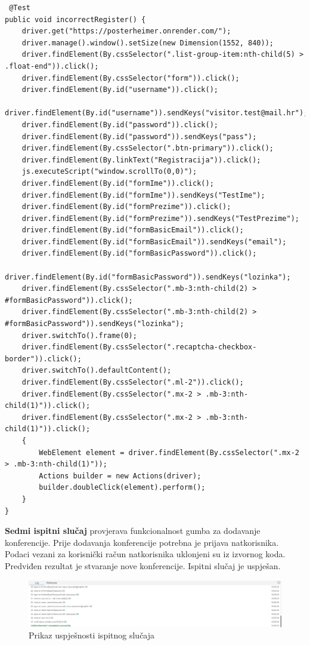 			\begin{lstlisting}
 @Test
public void incorrectRegister() {
	driver.get("https://posterheimer.onrender.com/");
	driver.manage().window().setSize(new Dimension(1552, 840));
	driver.findElement(By.cssSelector(".list-group-item:nth-child(5) > .float-end")).click();
	driver.findElement(By.cssSelector("form")).click();
	driver.findElement(By.id("username")).click();
	driver.findElement(By.id("username")).sendKeys("visitor.test@mail.hr");
	driver.findElement(By.id("password")).click();
	driver.findElement(By.id("password")).sendKeys("pass");
	driver.findElement(By.cssSelector(".btn-primary")).click();
	driver.findElement(By.linkText("Registracija")).click();
	js.executeScript("window.scrollTo(0,0)");
	driver.findElement(By.id("formIme")).click();
	driver.findElement(By.id("formIme")).sendKeys("TestIme");
	driver.findElement(By.id("formPrezime")).click();
	driver.findElement(By.id("formPrezime")).sendKeys("TestPrezime");
	driver.findElement(By.id("formBasicEmail")).click();
	driver.findElement(By.id("formBasicEmail")).sendKeys("email");
	driver.findElement(By.id("formBasicPassword")).click();
	driver.findElement(By.id("formBasicPassword")).sendKeys("lozinka");
	driver.findElement(By.cssSelector(".mb-3:nth-child(2) > #formBasicPassword")).click();
	driver.findElement(By.cssSelector(".mb-3:nth-child(2) > #formBasicPassword")).sendKeys("lozinka");
	driver.switchTo().frame(0);
	driver.findElement(By.cssSelector(".recaptcha-checkbox-border")).click();
	driver.switchTo().defaultContent();
	driver.findElement(By.cssSelector(".ml-2")).click();
	driver.findElement(By.cssSelector(".mx-2 > .mb-3:nth-child(1)")).click();
	driver.findElement(By.cssSelector(".mx-2 > .mb-3:nth-child(1)")).click();
	{
		WebElement element = driver.findElement(By.cssSelector(".mx-2 > .mb-3:nth-child(1)"));
		Actions builder = new Actions(driver);
		builder.doubleClick(element).perform();
	}
}
			\end{lstlisting}
			
\textbf{Sedmi ispitni slučaj} provjerava funkcionalnost gumba za dodavanje konferencije. Prije dodavanja konferencije potrebna je prijava natkorisnika. Podaci vezani za korisnički račun natkorisnika uklonjeni su iz izvornog koda. Predviđen rezultat  je stvaranje nove konferencije. Ispitni slučaj je uspješan.

	\begin{figure} [hbt!]
		\includegraphics[width=\linewidth]{Slike/addConferention}
		\caption{Prikaz uspješnosti ispitnog slučaja}
	\end{figure}

